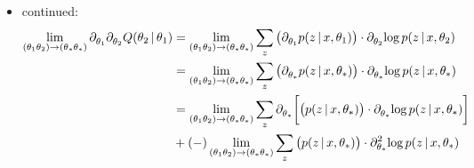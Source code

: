 \begin{frame} [t] 
\begin{itemize}
    \item continued:
    { \footnotesize
    \begin{align*}   
      \lim _{ ( \theta _{1} 
                \theta _{2} 
              )
              \rightarrow
              ( \theta _{*} 
                \theta _{*} 
              )
            } 
      \del {} {\theta _{1}} {}
      \del { Q \conditional 
               {\theta _{2}} 
               {\theta _{1}}
           } {\theta _{2}} {}
    & = 
      \lim _{ ( \theta _{1} 
                \theta _{2} 
              )
              \rightarrow
              ( \theta _{*} 
                \theta _{*} 
              )
            } 
       \sum _{z}
       \qty \big 
           ( \del { p \conditional 
                       {z} {x, \theta _{1}} 
                  } 
             {\theta _{1}} {}
           ) 
       \cdot 
       \del {} {\theta _{2}} {}
       \varlog p \conditional 
                  {z} {x, \theta _{2}} 
    \\ & = 
      \lim _{ ( \theta _{1} 
                \theta _{2} 
              )
              \rightarrow
              ( \theta _{*} 
                \theta _{*} 
              )
            } 
       \sum _{z}
       \qty \big 
           ( \del { p \conditional 
                        {z} 
                        {x, \theta _{*}} } 
             {\theta _{*}} {}
           ) 
       \cdot 
       \del {} {\theta _{*}} {}
       \varlog p \conditional
                  {z} {x, \theta _{*}} 
    \\ & = 
      \lim _{ ( \theta _{1} 
                \theta _{2} 
              )
              \rightarrow
              ( \theta _{*} 
                \theta _{*} 
              )
            } 
       \sum _{z}
       \del {} {\theta _{*}} {} 
       \qty \bigg [ 
       \qty \big 
           (  p \conditional 
                  {z} {x, \theta _{*}} 
           ) 
       \cdot 
       \del {} {\theta _{*}} {}
       \varlog p \conditional
                  {z} {x, \theta _{*}} 
        ] 
    \\ &
       + (-)  
     \lim _{ ( \theta _{1} 
        \theta _{2} 
      )
      \rightarrow
      ( \theta _{*} 
        \theta _{*} 
      )
            } 
       \sum _{z}
       \qty \big 
           (  p \conditional 
              {z} {x, \theta _{*}}
           ) 
       \cdot 
       \del {  } 
             {\theta _{*}} {2}
       \varlog p \conditional 
                   {z} {x, \theta _{*}}

\end{align*}}
\end{itemize}
\end{frame}
